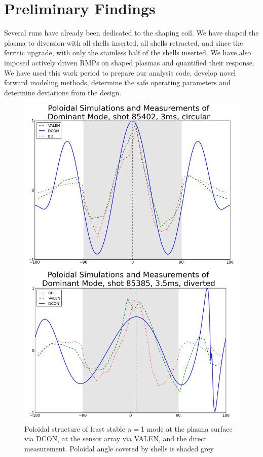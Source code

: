 \documentclass[aps,prl,twocolumn,superscriptaddress,groupedaddress]{revtex4}  %
\begin{document}
\section{Preliminary Findings}
	Several runs have already been dedicated to the shaping coil.  We have shaped the plasma to diversion with all shells inserted, all shells retracted, and since the ferritic upgrade, with only the stainless half of the shells inserted.  We have also imposed actively driven RMPs on shaped plasmas and quantified their response.  We have used this work period to prepare our analysis code, develop novel forward modeling methods, determine the safe operating parameters and determine deviations from the design. \par 
\begin{figure}[b]
	\centering
\includegraphics[scale=.3]{../Plots/DCON_VALEN_BD_comp_sh_unsh_mod.png}\caption{Poloidal structure of least stable \textit{n}$=$1 mode at the plasma surface via DCON, at the sensor array via VALEN, and the direct measurement. Poloidal angle covered by shells is shaded grey}
	\label{nat_mode_sim_v_meas}
	\end{figure}
	
\end{document}
